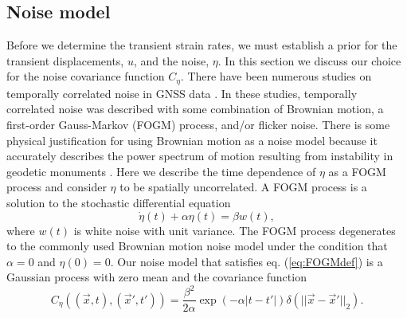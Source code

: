 \documentclass[extra,mreferee]{gji}
\begin{document}
\subsection{Noise model}\label{sec:NoiseModel}
Before we determine the transient strain rates, we must establish a prior for the transient displacements, $u$, and the noise, $\eta$. In this section we discuss our choice for the noise covariance function $C_\eta$. There have been numerous studies on temporally correlated noise in GNSS data \citep[e.g.,][]{Zhang1997,Mao1999,Williams2004,Langbein2008}. In these studies, temporally correlated noise was described with some combination of Brownian motion, a first-order Gauss-Markov (FOGM) process, and/or flicker noise. There is some physical justification for using Brownian motion as a noise model because it accurately describes the power spectrum of motion resulting from instability in geodetic monuments \citep[e.g.,][]{Wyatt1982,Wyatt1989}. Here we describe the time dependence of $\eta$ as a FOGM process and consider $\eta$ to be spatially uncorrelated. A FOGM process is a solution to the stochastic differential equation
\begin{equation}\label{eq:FOGMdef}
\dot{\eta}(t) + \alpha \eta(t) = \beta w(t),
\end{equation}
where $w(t)$ is white noise with unit variance. The FOGM process degenerates to the commonly used Brownian motion noise model under the condition that $\alpha=0$ and $\eta(0) = 0$. Our noise model that satisfies eq. (\ref{eq:FOGMdef}) is a Gaussian process with zero mean and the covariance function
\begin{equation}\label{eq:FOGM}
C_\eta\left((\vec{x},t),(\vec{x}',t')\right) = \frac{\beta^2}{2\alpha}\exp\left(-\alpha|t - t'|\right) \delta(||\vec{x} - \vec{x}'||_2). 
\end{equation}
\end{document}
